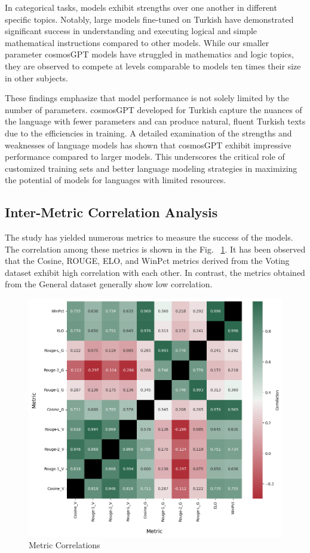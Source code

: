 \documentclass[conference]{IEEEtran}
\begin{document}
In categorical tasks, models exhibit strengths over one another in different specific topics. Notably, large models fine-tuned on Turkish have demonstrated significant success in understanding and executing logical and simple mathematical instructions compared to other models. While our smaller parameter cosmosGPT models have struggled in mathematics and logic topics, they are observed to compete at levels comparable to models ten times their size in other subjects.

These findings emphasize that model performance is not solely limited by the number of parameters. cosmosGPT developed for Turkish capture the nuances of the language with fewer parameters and can produce natural, fluent Turkish texts due to the efficiencies in training. A detailed examination of the strengths and weaknesses of language models has shown that cosmosGPT exhibit impressive performance compared to larger models. This underscores the critical role of customized training sets and better language modeling strategies in maximizing the potential of models for languages with limited resources.


\subsection{Inter-Metric Correlation Analysis}

The study has yielded numerous metrics to measure the success of the models. The correlation among these metrics is shown in the Fig. ~\ref{metric_correlations}. It has been observed that the Cosine, ROUGE, ELO, and WinPct metrics derived from the Voting dataset exhibit high correlation with each other. In contrast, the metrics obtained from the General dataset generally show low correlation.

\begin{figure}[htbp]
\centerline{\includegraphics[scale=0.45]{metric_correlations.png}}
\caption{Metric Correlations}
\label{metric_correlations}
\end{figure}
\end{document}
